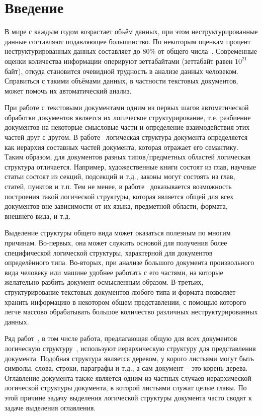 \section{Введение}
\label{sec:Chapter0} 

В мире с каждым годом возрастает объём данных, при этом неструктурированные данные составляют подавляющее большинство.
По некоторым оценкам процент неструктурированных данных составляет до 80\% от общего числа~\cite{white2000enterprise}.
Современные оценки количества информации оперируют зеттабайтами (зеттабайт равен $10^{21}$ байт),
откуда становится очевидной трудность в анализе данных человеком.
Справиться с такими объёмами данных, в частности текстовых документов, может помочь их автоматический анализ.

При работе с текстовыми документами одним из первых шагов автоматической обработки документов является их логическое структурирование,
т.е. разбиение документов на некоторые смысловые части и определение взаимодействия этих частей друг с другом.
В работе~\cite{dori1997representation} логическая структура документа определяется как иерархия составных частей документа, которая отражает его семантику.
Таким образом, для документов разных типов/предметных областей логическая структура отличается.
Например, художественные книги состоят из глав, научные статьи состоят из секций, подсекций и т.д., законы могут состоять из глав, статей, пунктов и т.п.
Тем не менее, в работе~\cite{dori1997representation} доказывается возможность построения такой логической структуры,
которая является общей для всех документов вне зависимости от их языка, предметной области, формата, внешнего вида, и т.д.

Выделение структуры общего вида может оказаться полезным по многим причинам.
Во-первых, она может служить основой для получения более специфической логической структуры, характерной для документов определённого типа.
Во-вторых, при анализе большого документа произвольного вида человеку или машине удобнее работать с его частями,
на которые желательно разбить документ осмысленным образом.
В-третьих, структурирование текстовых документов любого типа и формата позволяет хранить информацию в некотором общем представлении,
с помощью которого легче массово обрабатывать большое количество различных неструктурированных данных.

Ряд работ~\cite{summers1998automatic,liang1999document,mao2003document,doucet2011setting},
в том числе работа, предлагающая общую для всех документов логическую структуру~\cite{dori1997representation}, используют иерархическую структуру для представления документа.
Подобная структура является деревом, у корого листьями могут быть символы, слова, строки, параграфы и т.д., а сам документ -- это корень дерева.
Оглавление документа также является одним из частных случаев иерархической логической структуры документа, в которой листьями служат целые главы.
По этой причине задачу выделения логической структуры документа часто сводят к задаче выделения оглавления.

